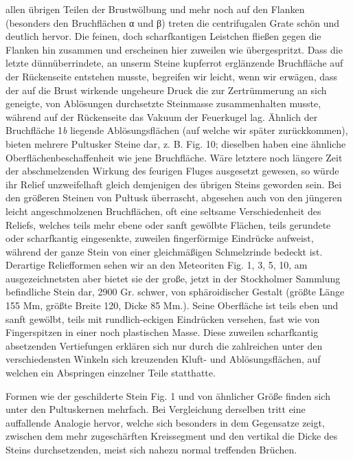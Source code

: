 \documentclass[a4paper, 11pt, oneside, german]{article}
\begin{document}
allen übrigen Teilen der Brustwölbung und mehr noch auf den Flanken (besonders den Bruchflächen α und β) treten die centrifugalen Grate schön und deutlich hervor. Die feinen, doch scharfkantigen Leistchen fließen gegen die Flanken hin zusammen und erscheinen hier zuweilen wie übergespritzt. Dass die letzte dünnüberrindete, an unserm Steine kupferrot erglänzende Bruchfläche auf der Rückenseite entstehen musste, begreifen wir leicht, wenn wir erwägen, dass der auf die Brust wirkende ungeheure Druck die zur Zertrümmerung an sich geneigte, von Ablösungen durchsetzte Steinmasse zusammenhalten musste, während auf der Rückenseite das Vakuum der Feuerkugel lag. Ähnlich der Bruchfläche 1\emph{b} liegende Ablösungsflächen (auf welche wir später zurückkommen), bieten mehrere Pultusker Steine dar, z. B. Fig. 10; dieselben haben eine ähnliche Oberflächenbeschaffenheit wie jene Bruchfläche. Wäre letztere noch längere Zeit der abschmelzenden Wirkung des feurigen Fluges ausgesetzt gewesen, so würde ihr Relief unzweifelhaft gleich demjenigen des übrigen Steins geworden sein. Bei den größeren Steinen von Pułtusk überrascht, abgesehen auch von den jüngeren leicht angeschmolzenen Bruchflächen, oft eine seltsame Verschiedenheit des Reliefs, welches teils mehr ebene oder sanft gewölbte Flächen, teils gerundete oder scharfkantig eingesenkte, zuweilen fingerförmige Eindrücke aufweist, während der ganze Stein von einer gleichmäßigen Schmelzrinde bedeckt ist. Derartige Reliefformen sehen wir an den Meteoriten Fig. 1, 3, 5, 10, am ausgezeichnetsten aber bietet sie der große, jetzt in der Stockholmer Sammlung befindliche Stein dar, 2900 Gr. schwer, von sphäroidischer Gestalt (größte Länge 155 Mm, größte Breite 120, Dicke 85 Mm.). Seine Oberfläche ist teils eben und sanft gewölbt, teils mit rundlich-eckigen Eindrücken versehen, fast wie von Fingerspitzen in einer noch plastischen Masse. Diese zuweilen scharfkantig absetzenden Vertiefungen erklären sich nur durch die zahlreichen unter den verschiedensten Winkeln sich kreuzenden Kluft- und Ablösungsflächen, auf welchen ein Abspringen einzelner Teile statthatte.

Formen wie der geschilderte Stein Fig. 1 und von ähnlicher Größe finden sich unter den Pultuskernen mehrfach. Bei Vergleichung derselben tritt eine auffallende Analogie hervor, welche sich besonders in dem Gegensatze zeigt, zwischen dem mehr zugeschärften Kreissegment und den vertikal die Dicke des Steins durchsetzenden, meist sich nahezu normal treffenden Brüchen.
\end{document}
